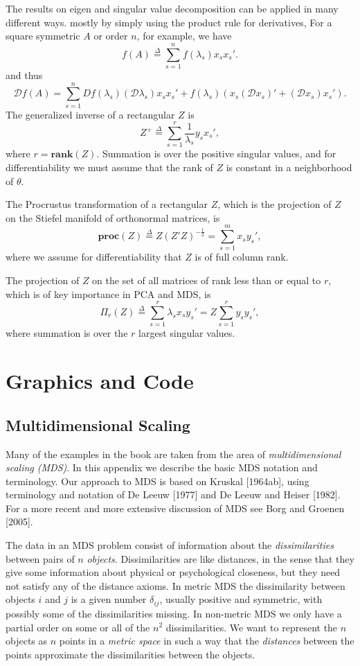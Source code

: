 \documentclass[
  12pt,
]{book}
\begin{document}
The results on eigen and singular value decomposition can be applied in many different ways. mostly by simply using the product rule for derivatives, For a square symmetric \(A\) or order \(n\), for example, we have
\[
f(A)\mathop{=}\limits^{\Delta}\sum_{s=1}^n f(\lambda_s)x_sx_s'.
\]
and thus
\[
\mathcal{D}f(A)=\sum_{s=1}^nDf(\lambda_s)(\mathcal{D}\lambda_s)x_sx_s'+f(\lambda_s)(x_s(\mathcal{D}x_s)'+(\mathcal{D}x_s)x_s').
\]
The generalized inverse of a rectangular \(Z\) is
\[
Z^+\mathop{=}\limits^{\Delta}\sum_{s=1}^r \frac{1}{\lambda_s}y_sx_s',
\]
where \(r=\mathbf{rank}(Z)\). Summation is over the positive singular values, and for differentiability we must assume that the rank of \(Z\) is constant in a neighborhood of \(\theta\).

The Procrustus transformation of
a rectangular \(Z\), which is the projection of \(Z\) on the Stiefel manifold of orthonormal matrices, is
\[
\mathbf{proc}(Z)\mathop{=}\limits^{\Delta}Z(Z'Z)^{-\frac12}=\sum_{s=1}^m x_sy_s',
\]
where we assume for differentiability that \(Z\) is of full column rank.

The projection of \(Z\) on the set of all matrices of rank less than or equal to \(r\), which is of key importance in PCA and MDS, is
\[
\Pi_r(Z)\mathop{=}\limits^{\Delta}\sum_{s=1}^r\lambda_s x_sy_s'=Z\sum_{s=1}^ry_sy_s',
\]
where summation is over the \(r\) largest singular values.

\hypertarget{graphics-and-code}{%
\section{Graphics and Code}\label{graphics-and-code}}

\hypertarget{multidimensional-scaling}{%
\subsection{Multidimensional Scaling}\label{multidimensional-scaling}}

Many of the examples in the book are taken from the area of \emph{multidimensional scaling (MDS)}. In this appendix we
describe the basic MDS notation and terminology. Our
approach to MDS is based on Kruskal {[}1964ab{]}, using
terminology and notation of De Leeuw {[}1977{]} and De Leeuw and Heiser {[}1982{]}.
For a more recent and more extensive discussion of
MDS see Borg and Groenen {[}2005{]}.

The data in an MDS problem consist of information about
the \emph{dissimilarities} between pairs of \(n\) \emph{objects}. Dissimilarities are like distances, in the sense that they give some information about physical or psychological closeness, but they need not satisfy any of the distance axioms. In
metric MDS the dissimilarity between objects \(i\) and \(j\)
is a given number \(\delta_{ij}\), usually positive and symmetric, with possibly some of the dissimilarities missing. In non-metric MDS we only have a partial order on some or all of the \(n^2\)
dissimilarities. We want to represent the \(n\)
objects as \(n\) points in a \emph{metric space} in such a way
that the \emph{distances} between the points approximate the dissimilarities between the objects.
\end{document}
